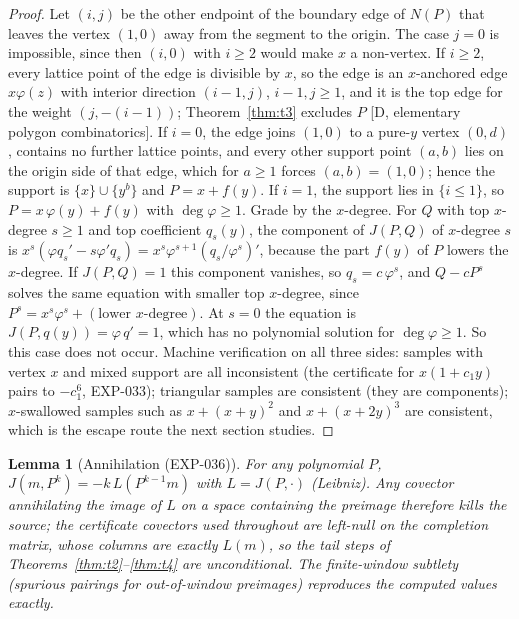 \documentclass[11pt]{article}
\newtheorem{lemma}[theorem]{Lemma}
\theoremstyle{remark}
\begin{document}
\begin{proof}
Let $(i,j)$ be the other endpoint of the boundary edge of $N(P)$ that leaves the vertex $(1,0)$ away from the segment to the origin. The case $j=0$ is impossible,
since then $(i,0)$ with $i\ge2$ would make $x$ a non-vertex. If $i\ge2$, every lattice point of the edge is divisible by $x$, so the edge is an $x$-anchored edge
$x\varphi(z)$ with interior direction $(i-1,j)$, $i-1,j\ge1$, and it is the top edge for the weight $(j,-(i-1))$; Theorem~\ref{thm:t3} excludes $P$ [D, elementary polygon
combinatorics]. If $i=0$, the edge joins $(1,0)$ to a pure-$y$ vertex $(0,d)$, contains no further lattice points, and every other support point $(a,b)$ lies on the
origin side of that edge, which for $a\ge1$ forces $(a,b)=(1,0)$; hence the support is $\{x\}\cup\{y^b\}$ and $P=x+f(y)$. If $i=1$, the support lies in $\{i\le1\}$, so
$P=x\,\varphi(y)+f(y)$ with $\deg\varphi\ge1$. Grade by the $x$-degree. For $Q$ with top $x$-degree $s\ge1$ and top coefficient $q_s(y)$, the component of $J(P,Q)$
of $x$-degree $s$ is $x^s(\varphi q_s'-s\varphi'q_s)=x^s\varphi^{s+1}(q_s/\varphi^s)'$, because the part $f(y)$ of $P$ lowers the $x$-degree. If $J(P,Q)=1$ this component
vanishes, so $q_s=c\,\varphi^s$, and $Q-cP^s$ solves the same equation with smaller top $x$-degree, since $P^s=x^s\varphi^s+(\text{lower }x\text{-degree})$. At $s=0$ the equation
is $J(P,q(y))=\varphi\,q'=1$, which has no polynomial solution for $\deg\varphi\ge1$. So this case does not occur. Machine verification on all three sides: samples with vertex
$x$ and mixed support are all inconsistent (the certificate for $x(1+c_1y)$ pairs to $-c_1^6$, EXP-033); triangular samples are consistent (they are components);
$x$-swallowed samples such as $x+(x+y)^2$ and $x+(x+2y)^3$ are consistent, which is the escape route the next section studies.
\end{proof}

\begin{lemma}[Annihilation (EXP-036)]\label{lem:annihilation}
For any polynomial $P$, $J(m, P^k) = -k\,L(P^{k-1} m)$ with $L = J(P, \cdot)$ (Leibniz). Any
covector annihilating the image of $L$ on a space containing the preimage therefore kills the
source; the certificate covectors used throughout are left-null on the completion matrix,
whose columns are exactly $L(m)$, so the tail steps of
Theorems~\ref{thm:t2}--\ref{thm:t4} are unconditional. The finite-window subtlety (spurious
pairings for out-of-window preimages) reproduces the computed values exactly.
\end{lemma}
\end{document}

